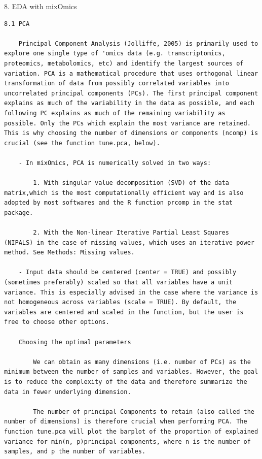 \documentclass[
]{book}
\begin{document}
8. EDA with mixOmics

\begin{verbatim}
8.1 PCA

    Principal Component Analysis (Jolliffe, 2005) is primarily used to explore one single type of 'omics data (e.g. transcriptomics, proteomics, metabolomics, etc) and identify the largest sources of variation. PCA is a mathematical procedure that uses orthogonal linear transformation of data from possibly correlated variables into uncorrelated principal components (PCs). The first principal component explains as much of the variability in the data as possible, and each following PC explains as much of the remaining variability as possible. Only the PCs which explain the most variance are retained. This is why choosing the number of dimensions or components (ncomp) is crucial (see the function tune.pca, below).

    - In mixOmics, PCA is numerically solved in two ways:

        1. With singular value decomposition (SVD) of the data matrix,which is the most computationally efficient way and is also adopted by most softwares and the R function prcomp in the stat package.

        2. With the Non-linear Iterative Partial Least Squares (NIPALS) in the case of missing values, which uses an iterative power method. See Methods: Missing values.

    - Input data should be centered (center = TRUE) and possibly (sometimes preferably) scaled so that all variables have a unit variance. This is especially advised in the case where the variance is not homogeneous across variables (scale = TRUE). By default, the variables are centered and scaled in the function, but the user is free to choose other options.

    Choosing the optimal parameters

        We can obtain as many dimensions (i.e. number of PCs) as the minimum between the number of samples and variables. However, the goal is to reduce the complexity of the data and therefore summarize the data in fewer underlying dimension.

        The number of principal Components to retain (also called the number of dimensions) is therefore crucial when performing PCA. The function tune.pca will plot the barplot of the proportion of explained variance for min(n, p)principal components, where n is the number of samples, and p the number of variables.


\end{verbatim}
\end{document}
